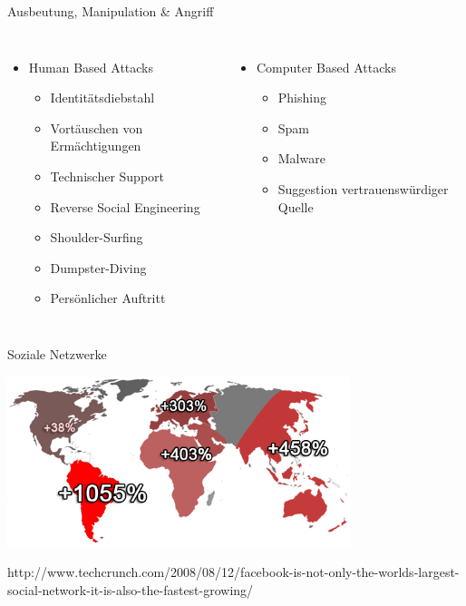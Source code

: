 \documentclass[11pt]{beamer}
\begin{document}
\begin{frame}[t]{Ausbeutung, Manipulation \& Angriff}
  \begin{columns}
  \vspace{3.8em}
  \begin{itemize}
    \item Human Based Attacks
    \begin{itemize}
      \item Identitätsdiebstahl
      \item Vortäuschen von Ermächtigungen
      \item Technischer Support
      \item Reverse Social Engineering
      \item Shoulder-Surfing
      \item Dumpster-Diving
      \item Persönlicher Auftritt
    \end{itemize}
  \end{itemize}
  \pause
  \begin{itemize}
    \item Computer Based Attacks
    \begin{itemize}
      \item Phishing
      \item Spam
      \item Malware
      \item Suggestion vertrauenswürdiger Quelle
    \end{itemize}
  \end{itemize}
  \end{columns}
\end{frame}

\begin{frame}[t]{Soziale Netzwerke}
  \begin{center}
    \includegraphics[width=0.75\textwidth]{growth}

    {\tiny
    http://www.techcrunch.com/2008/08/12/facebook-is-not-only-the-worlds-largest-social-network-it-is-also-the-fastest-growing/
    }
  \end{center}
\end{frame}
\end{document}
